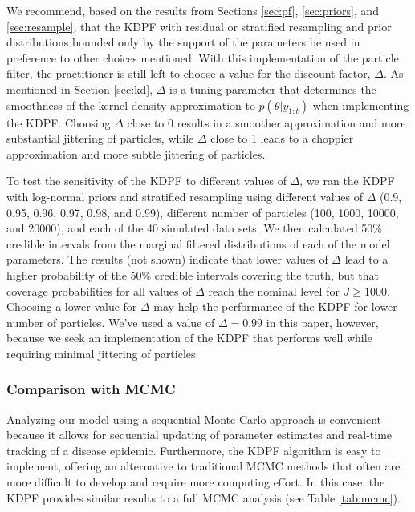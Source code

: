 \documentclass{elsarticle}
\begin{document}
We recommend, based on the results from Sections \ref{sec:pf}, \ref{sec:priors}, and \ref{sec:resample}, that the KDPF with residual or stratified resampling and prior distributions bounded only by the support of the parameters be used in preference to other choices mentioned. With this implementation of the particle filter, the practitioner is still left to choose a value for the discount factor, $\Delta$. As mentioned in Section \ref{sec:kd}, $\Delta$ is a tuning parameter that determines the smoothness of the kernel density approximation to $p(\theta|y_{1:t})$ when implementing the KDPF. Choosing $\Delta$ close to 0 results in a smoother approximation and more substantial jittering of particles, while $\Delta$ close to 1 leads to a choppier approximation and more subtle jittering of particles.

To test the sensitivity of the KDPF to different values of $\Delta$, we ran the KDPF with log-normal priors and stratified resampling using different values of $\Delta$ (0.9, 0.95, 0.96, 0.97, 0.98, and 0.99), different number of particles (100, 1000, 10000, and 20000), and each of the 40 simulated data sets. We then calculated 50\% credible intervals from the marginal filtered distributions of each of the model parameters. The results (not shown) indicate that lower values of $\Delta$ lead to a higher probability of the 50\% credible intervals covering the truth, but that coverage probabilities for all values of $\Delta$ reach the nominal level for $J \ge 1000$. Choosing a lower value for $\Delta$ may help the performance of the KDPF for lower number of particles. We've used a value of $\Delta = 0.99$ in this paper, however, because we seek an implementation of the KDPF that performs well while requiring minimal jittering of particles.

\subsubsection{Comparison with MCMC}

Analyzing our model using a sequential Monte Carlo approach is convenient because it allows for sequential updating of parameter estimates and real-time tracking of a disease epidemic. Furthermore, the KDPF algorithm is easy to implement, offering an alternative to traditional MCMC methods that often are more difficult to develop and require more computing effort. In this case, the KDPF provides similar results to a full MCMC analysis (see Table \ref{tab:mcmc}).
\end{document}
